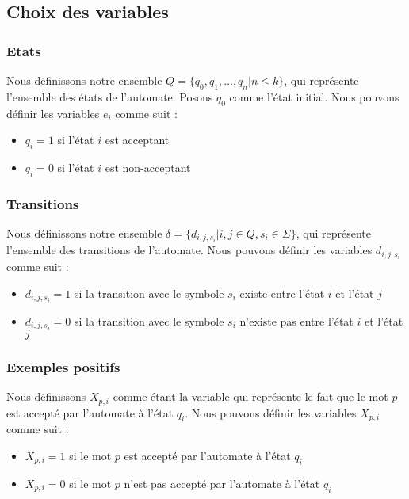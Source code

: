 \documentclass[a4paper, 12pt]{extarticle}
\begin{document}
\subsection{Choix des variables} %
\label{sub:choix_des_variables}

\subsubsection{Etats} %
\label{sec:etats}

Nous définissons notre ensemble $Q = \{q_0, q_1, \dots, q_n | n \le k\}$, qui 
représente l'ensemble des états de l'automate. Posons $q_0$ comme l'état initial.
Nous pouvons définir les variables $e_i$ comme suit : 
\begin{itemize}[label=$\bullet$]
    \item $q_i = 1$ si l'état $i$ est acceptant 
    \item $q_i = 0$ si l'état $i$ est non-acceptant 
\end{itemize}


\subsubsection{Transitions} %
\label{sec:transitions} 


Nous définissons notre ensemble $\delta = \{d_{i, j, s_i} | i, j \in Q, s_i \in \Sigma\}$, qui 
représente l'ensemble des transitions de l'automate. 
Nous pouvons définir les variables $d_{i, j, s_i}$ comme suit : 
\begin{itemize}[label=$\bullet$]
    \item $d_{i, j, s_i} = 1$ si la transition avec le symbole $s_i$ existe entre l'état $i$ et l'état $j$ 
    \item $d_{i, j, s_i} = 0$ si la transition avec le symbole $s_i$ n'existe pas entre l'état $i$ et l'état $j$ 
\end{itemize} 


\subsubsection{Exemples positifs} %
\label{sec:exemples_positifs}

Nous définissons $X_{p, i}$ comme étant la variable qui représente le fait que le mot $p$ est accepté par l'automate à l'état $q_i$.
Nous pouvons définir les variables $X_{p, i}$ comme suit : 
\begin{itemize}[label=$\bullet$]
    \item $X_{p, i} = 1$ si le mot $p$ est accepté par l'automate à l'état $q_i$ 
    \item $X_{p, i} = 0$ si le mot $p$ n'est pas accepté par l'automate à l'état $q_i$ 
\end{itemize}
\end{document}
